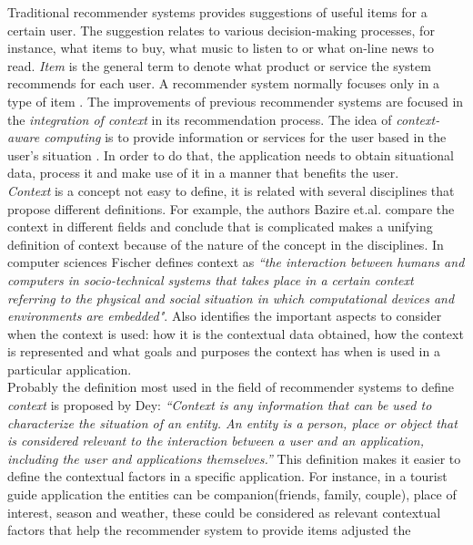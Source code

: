 Traditional recommender systems provides suggestions of useful items
for a certain user. The suggestion relates to various decision-making
processes, for instance, what items to buy, what music to listen to or
what on-line news to read. \textit{Item} is the general term to denote
what product or service the system recommends for each user. A
recommender system normally focuses only in a type of item
\cite{resnick1997recommender}.
The improvements of previous recommender systems are focused in the
\textit{integration of context} in its recommendation process. 
The idea of \textit{context-aware computing} is to provide
information or services for the user based in the user's situation
\cite{dey2001understanding}. In order to do that, the application 
needs to obtain situational data, process it and make use of it 
in a manner that benefits the user. \\ 
\textit{Context} is a concept not easy to define, it is related with
several disciplines that propose different definitions. For example,
the authors Bazire et.al.\cite{bazire2005understanding} compare the
context in different fields and conclude that is complicated makes a
unifying definition of context because of the nature of the concept in
the disciplines. In computer sciences Fischer\cite{fischer2012context}
defines context as \textit{``the interaction between humans and
computers in socio-technical systems that takes place in a certain
context referring to the physical and social situation in which
computational devices and environments are embedded"}. Also identifies
the important aspects to consider when the context is used: how it is
the contextual data obtained, how the context is represented and what
goals and purposes the context has when is used in a particular
application. \\
Probably the definition most used in the field of recommender systems to 
define \textit{context} is proposed by Dey\cite{dey2001understanding}:
\textit{``Context is any information that can be used to characterize
the situation of an entity. An entity is a person, place or object
that is considered relevant to the interaction between a user and  an
application, including the user and applications themselves.''}  This
definition makes it easier to define the contextual factors in a
specific application. For instance, in a tourist guide application the
entities can be companion(friends, family, couple), place of interest,
season and weather, these could be considered as relevant contextual
factors that help the recommender system to provide items adjusted the
